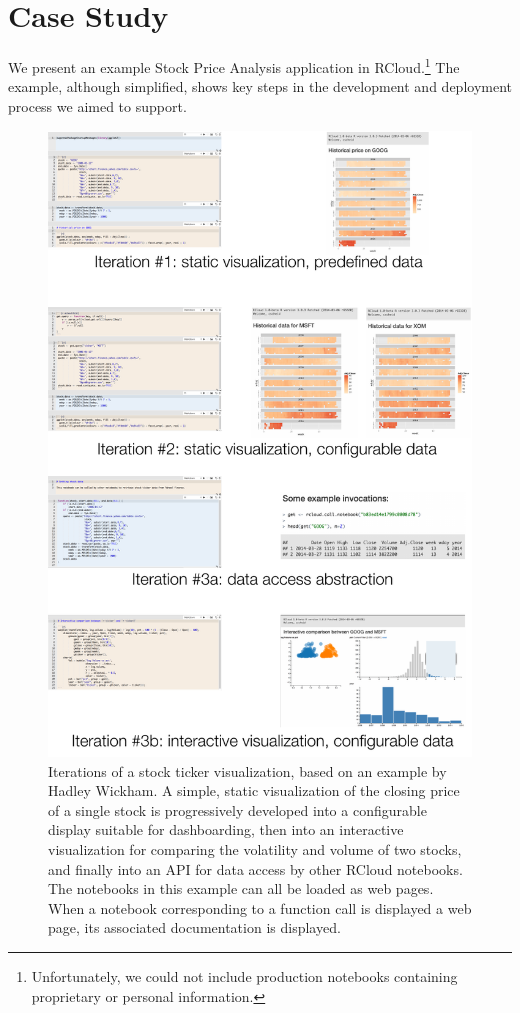\section{Case Study}

We present an example Stock Price Analysis application
in RCloud.\footnote{Unfortunately,
we could not include production notebooks containing proprietary or personal
information.} The example, although simplified, shows key steps in the
development and deployment process we aimed to support.

\begin{figure}
\includegraphics[width=\linewidth]{fig/casestudy1/casestudy1.pdf}
\caption{\label{fig:stockvis}Iterations of a stock ticker
  visualization, based on an example by Hadley Wickham. A
  simple, static visualization of the closing price of a single stock
  is progressively developed into a configurable display suitable
  for dashboarding, then into an interactive visualization for 
  comparing the volatility and volume of two stocks, and finally
  into an API for data access by other RCloud notebooks. The notebooks
  in this example can all be loaded as web pages. When a notebook
  corresponding to a function call is displayed a web page,
  its associated documentation is displayed.}
\end{figure}

